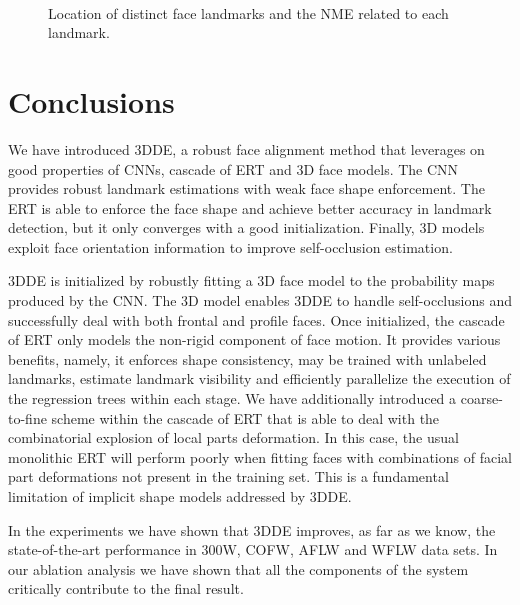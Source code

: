 \documentclass[11pt,twocolumn]{article}
\begin{document}
\begin{figure}
  \centering
  \\
  \caption{Location of distinct face landmarks and the NME related to each landmark.}
  \label{fig:cross}
\end{figure}



\section{Conclusions}\label{sec:conclusions}
We have introduced 3DDE, a robust face alignment method that leverages on good properties of CNNs, cascade of ERT and 3D face models. The CNN provides robust landmark estimations with weak face shape enforcement. The ERT is able to enforce the face shape and achieve better accuracy in landmark detection, but it only converges with a good initialization. Finally, 3D models exploit face orientation information to improve self-occlusion estimation. 

3DDE is initialized by robustly fitting a 3D face model to the probability maps produced by the CNN. The 3D model enables 3DDE to handle self-occlusions and successfully deal with both frontal and profile faces. Once initialized, the cascade of ERT only models the non-rigid component of face motion. It provides various benefits, namely, it enforces shape consistency, may be trained with unlabeled landmarks, estimate landmark visibility and efficiently parallelize the execution of the regression trees within each stage. We have additionally introduced a coarse-to-fine scheme within the cascade of  ERT that is able to deal with the combinatorial explosion of local parts deformation. In this case, the usual monolithic ERT will perform poorly when fitting faces with combinations of facial part deformations not present in the training set. This is a fundamental limitation of implicit shape models addressed by 3DDE.

In the experiments we have shown that 3DDE improves, as far as we know, the state-of-the-art performance in 300W, COFW, AFLW and WFLW data sets. In our ablation analysis we have shown that all the components of the system critically contribute to the final result. 
\end{document}
